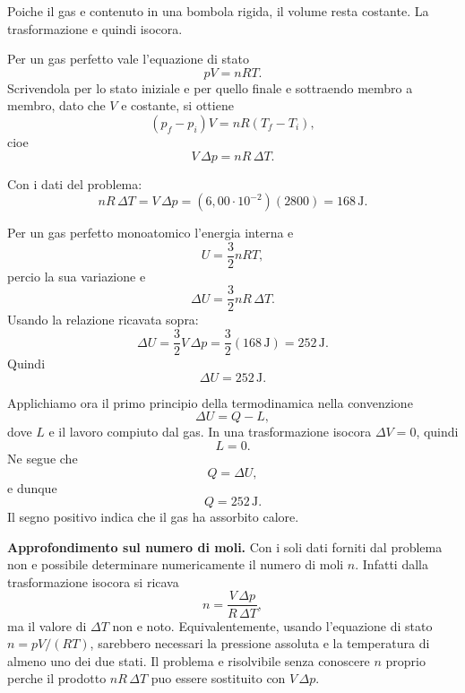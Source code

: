 \begin{soluzione}
Poiche il gas e contenuto in una bombola rigida, il volume resta costante. La
trasformazione e quindi isocora.

Per un gas perfetto vale l'equazione di stato
\[
pV=nRT.
\]
Scrivendola per lo stato iniziale e per quello finale e sottraendo membro a
membro, dato che \(V\) e costante, si ottiene
\[
(p_f-p_i)V=nR(T_f-T_i),
\]
cioe
\[
V\,\Delta p=nR\,\Delta T.
\]

Con i dati del problema:
\[
nR\,\Delta T=V\,\Delta p
=(6{,}00\cdot10^{-2})(2800)=168\,\mathrm{J}.
\]

Per un gas perfetto monoatomico l'energia interna e
\[
U=\frac{3}{2}nRT,
\]
percio la sua variazione e
\[
\Delta U=\frac{3}{2}nR\,\Delta T.
\]
Usando la relazione ricavata sopra:
\[
\Delta U=\frac{3}{2}V\,\Delta p
=\frac{3}{2}(168\,\mathrm{J})
=252\,\mathrm{J}.
\]
Quindi
\[
\boxed{\Delta U=252\,\mathrm{J}}.
\]

Applichiamo ora il primo principio della termodinamica nella convenzione
\[
\Delta U=Q-L,
\]
dove \(L\) e il lavoro compiuto dal gas. In una trasformazione isocora
\(\Delta V=0\), quindi
\[
L=0.
\]
Ne segue che
\[
Q=\Delta U,
\]
e dunque
\[
\boxed{Q=252\,\mathrm{J}}.
\]
Il segno positivo indica che il gas ha assorbito calore.

\medskip
\textbf{Approfondimento sul numero di moli.}
Con i soli dati forniti dal problema non e possibile determinare numericamente
il numero di moli \(n\). Infatti dalla trasformazione isocora si ricava
\[
n=\frac{V\,\Delta p}{R\,\Delta T},
\]
ma il valore di \(\Delta T\) non e noto. Equivalentemente, usando l'equazione
di stato \(n=pV/(RT)\), sarebbero necessari la pressione assoluta e la
temperatura di almeno uno dei due stati. Il problema e risolvibile senza
conoscere \(n\) proprio perche il prodotto \(nR\,\Delta T\) puo essere
sostituito con \(V\,\Delta p\).
\end{soluzione}
